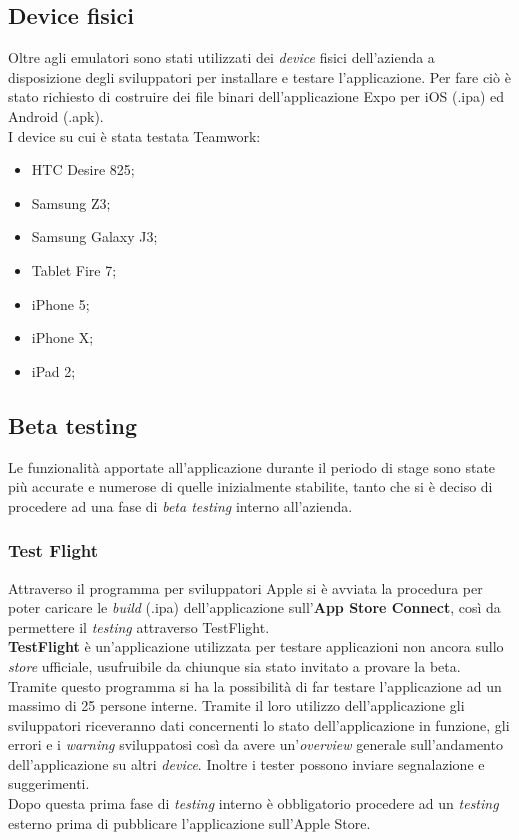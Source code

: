 \subsection{Device fisici}
Oltre agli emulatori sono stati utilizzati dei \emph{device} fisici dell'azienda a disposizione degli sviluppatori per installare e testare l'applicazione. Per fare ciò è stato richiesto di costruire dei file binari dell'applicazione Expo per iOS (.ipa) ed Android (.apk). \\
I device su cui è stata testata Teamwork:
\begin{itemize}
	\item HTC Desire 825;
	\item Samsung Z3;
	\item Samsung Galaxy J3;
	\item Tablet Fire 7;
	\item iPhone 5;
	\item iPhone X;
	\item iPad 2;
\end{itemize}

\subsection{Beta testing}
Le funzionalità apportate all'applicazione durante il periodo di stage sono state più accurate e numerose di quelle inizialmente stabilite, tanto che si è deciso di procedere ad una fase di \emph{beta testing }interno all'azienda.\\
\subsubsection{Test Flight}
Attraverso il programma per sviluppatori Apple si è avviata la procedura per poter caricare le \emph{build} (.ipa) dell'applicazione sull'\textbf{App Store Connect}, così da permettere il \emph{testing} attraverso TestFlight.\\
\textbf{TestFlight} è un'applicazione utilizzata per testare applicazioni non ancora sullo \emph{store} ufficiale, usufruibile da chiunque sia stato invitato a provare la beta. Tramite questo programma si ha la possibilità di far testare l'applicazione ad un massimo di 25 persone interne. 
Tramite il loro utilizzo dell'applicazione gli sviluppatori riceveranno dati concernenti lo stato dell'applicazione in funzione, gli errori e i \emph{warning} sviluppatosi così da avere un'\emph{overview} generale sull'andamento dell'applicazione su altri \emph{device}. Inoltre i tester possono inviare segnalazione e suggerimenti. \\
Dopo questa prima fase di \emph{testing} interno è obbligatorio procedere ad un \emph{testing} esterno prima di pubblicare l'applicazione sull'Apple Store.